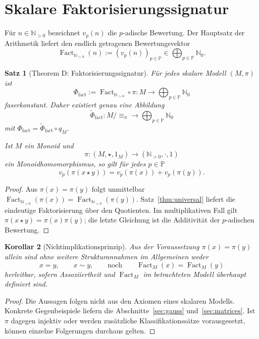 \documentclass[11pt,a4paper,reqno]{amsart}
\newtheorem{theorem}{Satz}[section]
\newtheorem{corollary}[theorem]{Korollar}
\theoremstyle{definition}
\theoremstyle{remark}
\newcommand{\Npos}{\mathbb{N}_{>0}}
\newcommand{\Nzero}{\mathbb{N}_{0}}
\newcommand{\Pset}{\mathbb{P}}
\newcommand{\Fact}{\operatorname{Fact}}
\begin{document}
\section{Skalare Faktorisierungssignatur}

Für $n\in\Npos$ bezeichnet $v_p(n)$ die $p$-adische Bewertung. Der Hauptsatz der Arithmetik liefert den endlich getragenen Bewertungsvektor
\[
  \Fact_{\Npos}(n):=(v_p(n))_{p\in\Pset}
  \in\bigoplus_{p\in\Pset}\Nzero.
\]

\begin{theorem}[Theorem D: Faktorisierungssignatur]
\label{thm:factor-signature}
Für jedes skalare Modell $(M,\pi)$ ist
\[
  \Phi_{\mathrm{fact}}
  :=\Fact_{\Npos}\circ\pi
  \colon M\longrightarrow\bigoplus_{p\in\Pset}\Nzero
\]
faserkonstant. Daher existiert genau eine Abbildung
\[
  \widetilde\Phi_{\mathrm{fact}}
  \colon M/{\equiv_\pi}
  \longrightarrow\bigoplus_{p\in\Pset}\Nzero
\]
mit $\Phi_{\mathrm{fact}}=\widetilde\Phi_{\mathrm{fact}}\circ q_M$.

Ist $M$ ein Monoid und
\[
  \pi\colon(M,\star,1_M)\longrightarrow(\Npos,\cdot,1)
\]
ein Monoidhomomorphismus, so gilt für jedes $p\in\Pset$
\[
  v_p\!\left(\pi(x\star y)\right)
  =v_p(\pi(x))+v_p(\pi(y)).
\]
\end{theorem}

\begin{proof}
Aus $\pi(x)=\pi(y)$ folgt unmittelbar
$\Fact_{\Npos}(\pi(x))=\Fact_{\Npos}(\pi(y))$. Satz~\ref{thm:universal} liefert die eindeutige Faktorisierung über den Quotienten. Im multiplikativen Fall gilt $\pi(x\star y)=\pi(x)\pi(y)$; die letzte Gleichung ist die Additivität der $p$-adischen Bewertung.
\end{proof}

\begin{corollary}[Nichtimplikationsprinzip]
\label{cor:nonimplication}
Aus der Voraussetzung $\pi(x)=\pi(y)$ allein sind ohne weitere Strukturannahmen im Allgemeinen weder
\[
  x=y,
  \qquad x\sim y,
  \qquad\text{noch}\qquad
  \Fact_M(x)=\Fact_M(y)
\]
herleitbar, sofern Assoziiertheit und $\Fact_M$ im betrachteten Modell überhaupt definiert sind.
\end{corollary}

\begin{proof}
Die Aussagen folgen nicht aus den Axiomen eines skalaren Modells. Konkrete Gegenbeispiele liefern die Abschnitte~\ref{sec:gauss} und~\ref{sec:matrices}. Ist $\pi$ dagegen injektiv oder werden zusätzliche Klassifikationssätze vorausgesetzt, können einzelne Folgerungen durchaus gelten.
\end{proof}
\end{document}
